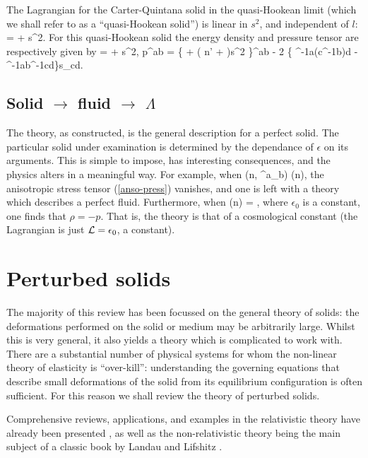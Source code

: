 The Lagrangian for the Carter-Quintana solid in the  quasi-Hookean limit (which we shall refer to as a ``quasi-Hookean solid'') is linear in $s^2$, and independent of $l$:
\bea
{} = \check{\epsilon} + s^2.
\eea
For this quasi-Hookean solid the energy density and pressure tensor are respectively given by
\bse
\bea
\rho = \check{\rho} + \mu s^2,
\eea
\bea
p^{ab} = \left\{  + \left( n\mu' + \mu\right)s^2 \right\}\gamma^{ab} - 2 \mu\left\{  \eta^{-1a(c}\eta^{-1b)d} - \eta^{-1ab}\eta^{-1cd}\right\}s_{cd}.
\eea
\ese

\subsection{Solid $\rightarrow$ fluid $\rightarrow$ $\Lambda$}
The theory, as constructed, is the general description for a perfect solid. The particular solid under examination is determined by the dependance of $\epsilon$ on its   arguments. This is simple to impose,   has interesting consequences, and  the physics alters in a meaningful way.  For example, when
\bea
\epsilon\left(n, {\eta^a}_b\right) \longrightarrow \epsilon(n),
\eea
  the anisotropic stress tensor (\ref{anso-press}) vanishes, and one is left with a theory which describes a perfect fluid. Furthermore, when 
\bea
\epsilon(n) = ,
\eea
where $\epsilon_0$ is a constant, one finds that $\rho = - p$.  That is, the theory is that of a cosmological constant (the Lagrangian is just $\mathcal{L} = \epsilon_0$, a constant).
\section{Perturbed solids}
The majority of this review has been focussed on the general theory of solids: the deformations performed on the solid or medium may be arbitrarily large. Whilst this is very general, it also yields a theory which is complicated to work with. There are a substantial number of physical systems for whom the non-linear theory of elasticity is ``over-kill'': understanding the governing equations that describe small deformations of the solid from its equilibrium configuration is often sufficient. For this reason we shall review the theory of perturbed solids.

Comprehensive reviews, applications, and examples in the relativistic theory have already been presented \cite{Carter:1973zz, Carter:1977qf, Bucher:1998mh, Battye:2005ik, Battye:2007aa, Battye:2013er, Pearson:2014iaa}, as well as the non-relativistic theory being the main subject of a classic book by Landau and Lifshitz \cite{ll_elast}.

